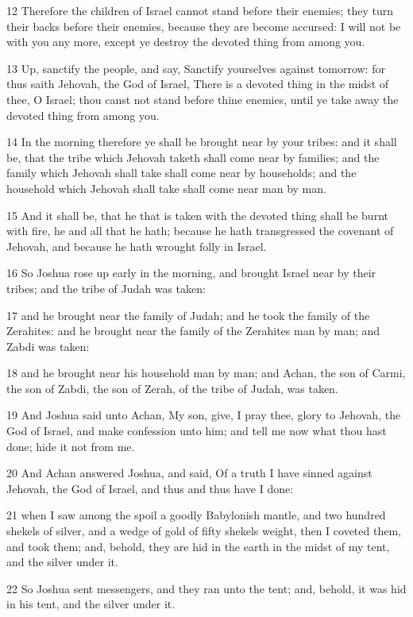 \par 12 Therefore the children of Israel cannot stand before their enemies; they turn their backs before their enemies, because they are become accursed: I will not be with you any more, except ye destroy the devoted thing from among you.
\par 13 Up, sanctify the people, and say, Sanctify yourselves against tomorrow: for thus saith Jehovah, the God of Israel, There is a devoted thing in the midst of thee, O Israel; thou canst not stand before thine enemies, until ye take away the devoted thing from among you.
\par 14 In the morning therefore ye shall be brought near by your tribes: and it shall be, that the tribe which Jehovah taketh shall come near by families; and the family which Jehovah shall take shall come near by households; and the household which Jehovah shall take shall come near man by man.
\par 15 And it shall be, that he that is taken with the devoted thing shall be burnt with fire, he and all that he hath; because he hath transgressed the covenant of Jehovah, and because he hath wrought folly in Israel.
\par 16 So Joshua rose up early in the morning, and brought Israel near by their tribes; and the tribe of Judah was taken:
\par 17 and he brought near the family of Judah; and he took the family of the Zerahites: and he brought near the family of the Zerahites man by man; and Zabdi was taken:
\par 18 and he brought near his household man by man; and Achan, the son of Carmi, the son of Zabdi, the son of Zerah, of the tribe of Judah, was taken.
\par 19 And Joshua said unto Achan, My son, give, I pray thee, glory to Jehovah, the God of Israel, and make confession unto him; and tell me now what thou hast done; hide it not from me.
\par 20 And Achan answered Joshua, and said, Of a truth I have sinned against Jehovah, the God of Israel, and thus and thus have I done:
\par 21 when I saw among the spoil a goodly Babylonish mantle, and two hundred shekels of silver, and a wedge of gold of fifty shekels weight, then I coveted them, and took them; and, behold, they are hid in the earth in the midst of my tent, and the silver under it.
\par 22 So Joshua sent messengers, and they ran unto the tent; and, behold, it was hid in his tent, and the silver under it.

